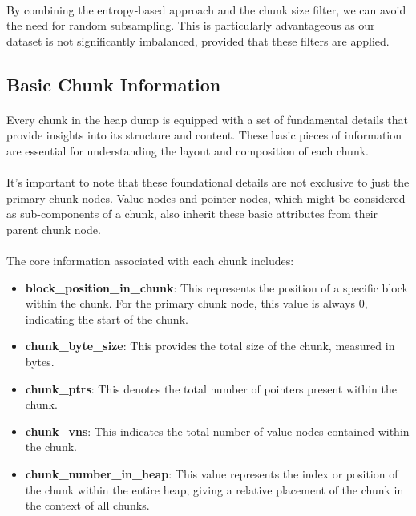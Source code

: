         \paragraph{}By combining the entropy-based approach and the chunk size filter, we can avoid the need for random subsampling. This is particularly advantageous as our dataset is not significantly imbalanced, provided that these filters are applied.
    

\subsection{Basic Chunk Information}\label{seq:embedding:basic_chunk_information}

    \paragraph{}Every chunk in the heap dump is equipped with a set of fundamental details that provide insights into its structure and content. These basic pieces of information are essential for understanding the layout and composition of each chunk.

    \paragraph{}It's important to note that these foundational details are not exclusive to just the primary chunk nodes. Value nodes and pointer nodes, which might be considered as sub-components of a chunk, also inherit these basic attributes from their parent chunk node.

    \paragraph{}The core information associated with each chunk includes:

    \begin{itemize}
        \item \textbf{block\_position\_in\_chunk}: This represents the position of a specific block within the chunk. For the primary chunk node, this value is always 0, indicating the start of the chunk.
        
        \item \textbf{chunk\_byte\_size}: This provides the total size of the chunk, measured in bytes.
        
        \item \textbf{chunk\_ptrs}: This denotes the total number of pointers present within the chunk.
        
        \item \textbf{chunk\_vns}: This indicates the total number of value nodes contained within the chunk.
        
        \item \textbf{chunk\_number\_in\_heap}: This value represents the index or position of the chunk within the entire heap, giving a relative placement of the chunk in the context of all chunks.
    \end{itemize}

